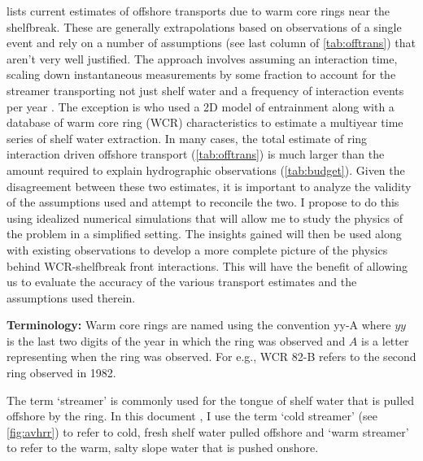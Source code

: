  lists current estimates of offshore transports due to warm core rings near the shelfbreak.  These are generally extrapolations based on observations of a single event and rely on a number of assumptions (see last column of \cref{tab:offtrans}) that aren’t very well justified. The approach involves assuming an interaction time, scaling down instantaneous measurements by some fraction to account for the streamer transporting not just shelf water and a frequency of interaction events per year \citep[e.g.\ ][]{Garfield1987}. The exception is \cite{Chaudhuri2009} who used a 2D model of entrainment along with a database of warm core ring (WCR) characteristics to estimate a multiyear time series of shelf water extraction. In many cases, the total estimate of ring interaction driven offshore transport (\cref{tab:offtrans}) is much larger than the amount required to explain hydrographic observations (\cref{tab:budget}). Given the disagreement between these two estimates, it is important to analyze the validity of the assumptions used and attempt to reconcile the two. I propose to do this using idealized numerical simulations that will allow me to study the physics of the problem in a simplified setting. The insights gained will then be used along with existing observations to develop a more complete picture of the physics behind WCR-shelfbreak front interactions. This will have the benefit of allowing us to evaluate the accuracy of the various transport estimates and the assumptions used therein.

\textbf{Terminology:} Warm core rings are named using the convention yy-A where $yy$ is the last two digits of the year in which the ring was observed and $A$ is a letter representing when the ring was observed. For e.g., WCR 82-B refers to the second ring observed in 1982.

The term ‘streamer’ is commonly used for the tongue of shelf water that is pulled offshore by the ring. In this document \citep[as in][]{Evans1985}, I use the term ‘cold streamer’ (see \cref{fig:avhrr}) to refer to cold, fresh shelf water pulled offshore and ‘warm streamer’ to refer to the warm, salty slope water that is pushed onshore.

%



